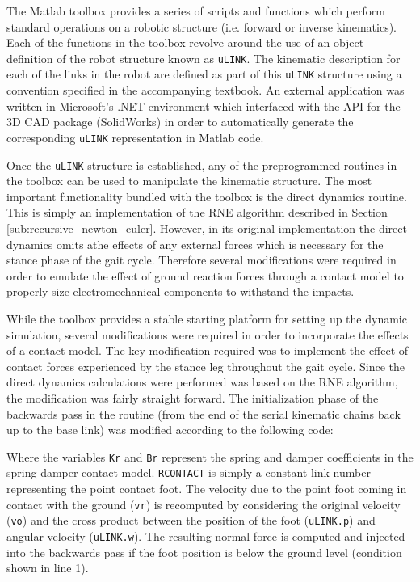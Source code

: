 The Matlab toolbox provides a series of scripts and functions which perform standard operations on a robotic structure (i.e. forward or inverse kinematics). Each of the functions in the toolbox revolve around the use of an object definition of the robot structure known as \texttt{uLINK}. The kinematic description for each of the links in the robot are defined as part of this \texttt{uLINK} structure using a convention specified in the accompanying textbook. An external application was written in Microsoft's .NET environment which interfaced with the API for the 3D CAD package (SolidWorks) in order to automatically generate the corresponding \texttt{uLINK} representation in Matlab code. 

Once the \texttt{uLINK} structure is established, any of the preprogrammed routines in the toolbox can be used to manipulate the kinematic structure. The most important functionality bundled with the toolbox is the direct dynamics routine. This is simply an implementation of the RNE algorithm described in Section \ref{sub:recursive_newton_euler}. However, in its original implementation the direct dynamics omits athe effects of any external forces which is necessary for the stance phase of the gait cycle. Therefore several modifications were required in order to emulate the effect of ground reaction forces through a contact model to properly size electromechanical components to withstand the impacts. 

While the toolbox provides a stable starting platform for setting up the dynamic simulation, several modifications were required in order to incorporate the effects of a contact model. The key modification required was to implement the effect of contact forces experienced by the stance leg throughout the gait cycle. Since the direct dynamics calculations were performed was based on the RNE algorithm, the modification was fairly straight forward. The initialization phase of the backwards pass in the routine (from the end of the serial kinematic chains back up to the base link) was modified according to the following code: 



Where the variables \texttt{Kr} and \texttt{Br} represent the spring and damper coefficients in the spring-damper contact model. \texttt{RCONTACT} is simply a constant link number representing the point contact foot. The velocity due to the point foot coming in contact with the ground (\texttt{vr}) is recomputed by considering the original velocity (\texttt{vo}) and the cross product between the position of the foot (\texttt{uLINK.p}) and angular velocity (\texttt{uLINK.w}). The resulting normal force is computed and injected into the backwards pass if the foot position is below the ground level (condition shown in line 1). 

